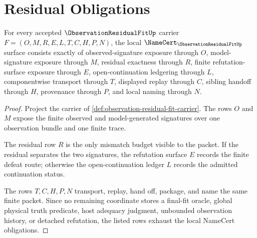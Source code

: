 \section{Residual Obligations}
\label{sec:observation-residual-fit-obligations}

\begin{theorem}
\label{thm:observation-residual-fit-namecert-obligations}
For every accepted $\ObservationResidualFitUp$ carrier $F=(O,M,R,E,L,T,C,H,P,N)$, the local $\NameCert_{\ObservationResidualFitUp}$ surface consists exactly of observed-signature exposure through $O$, model-signature exposure through $M$, residual exactness through $R$, finite refutation-surface exposure through $E$, open-continuation ledgering through $L$, componentwise transport through $T$, displayed replay through $C$, sibling handoff through $H$, provenance through $P$, and local naming through $N$.
\end{theorem}
\begin{proof}
Project the carrier of \autoref{def:observation-residual-fit-carrier}. The rows $O$ and $M$ expose the finite observed and model-generated signatures over one observation bundle and one finite trace.

The residual row $R$ is the only mismatch budget visible to the packet. If the residual separates the two signatures, the refutation surface $E$ records the finite defeat route; otherwise the open-continuation ledger $L$ records the admitted continuation status.

The rows $T,C,H,P,N$ transport, replay, hand off, package, and name the same finite packet. Since no remaining coordinate stores a final-fit oracle, global physical truth predicate, host adequacy judgment, unbounded observation history, or detached refutation, the listed rows exhaust the local NameCert obligations.
\end{proof}


